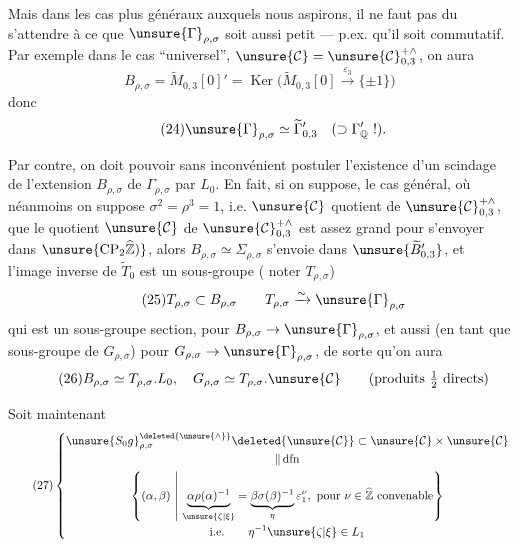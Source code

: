 
Mais dans les cas plus généraux auxquels nous aspirons, il ne faut pas du  s'attendre à ce que $\unsure{\Gamma}_{\rho,\sigma}$ soit aussi petit --- p.ex. qu'il soit commutatif.
Par exemple dans le cas ``universel'', $\unsure{\mathcal{C}}=\unsure{\mathcal{C}}_{0,3}^{+\wedge}$, on aura
\[
\tag{23}
B_{\rho,\sigma}=\widetilde{M}_{0,3}[0]'=
\operatorname{Ker}\bigl(\widetilde{M}_{0,3}[0]\xrightarrow{\varepsilon_3}\{\pm1\}\bigr)
\]
donc
\[
\tag{24}
\unsure{\Gamma}_{\rho,\sigma}\simeq\widetilde{\Gamma}_{0,3}'
\quad(\supset\Gamma_{\mathbb{Q}}'\ !).
\]

Par contre, on doit pouvoir sans inconvénient postuler l'existence d'un scindage  de l'extension $B_{\rho,\sigma}$ de $\Gamma_{\rho,\sigma}$ par $L_0$.
En fait, si on suppose,  
 le cas général, où néanmoins on suppose $\sigma^2=\rho^3=1$, i.e. $\unsure{\mathcal{C}}$ quotient de $\unsure{\mathcal{C}}_{0,3}^{+\wedge}$, que le quotient $\unsure{\mathcal{C}}$ de $\unsure{\mathcal{C}}_{0,3}^{+\wedge}$ est assez grand pour s'envoyer dans $\unsure{\mathrm{CP}_2\widehat{\mathbb{Z}})}$, alors  $B_{\rho,\sigma}\simeq\Sigma_{\rho,\sigma}$ s'envoie dans $\unsure{\widetilde{B}'_{0,3}}$, et l'image inverse de $\widetilde{T}_0$ est un sous-groupe ( noter $T_{\rho,\sigma}$)
\[
\tag{25}
T_{\rho,\sigma}\subset B_{\rho,\sigma}\qquad
T_{\rho,\sigma}\xrightarrow{\sim}\unsure{\Gamma}_{\rho,\sigma}
\]
qui est un sous-groupe section, pour $B_{\rho,\sigma}\to\unsure{\Gamma}_{\rho,\sigma}$, et aussi (en tant que sous-groupe de $G_{\rho,\sigma}$) pour $G_{\rho,\sigma}\to\unsure{\Gamma}_{\rho,\sigma}$, de sorte qu'on aura
\[
\tag{26}
B_{\rho,\sigma}\simeq T_{\rho,\sigma}.L_0,\quad
G_{\rho,\sigma}\simeq T_{\rho,\sigma}.\unsure{\mathcal{C}}
\qquad\text{(produits $\tfrac12$ directs)}
\]


Soit maintenant
\[
\tag{27}
\left\{
\begin{gathered}
\unsure{S_0g}_{\rho,\sigma}^{\deleted{\unsure{\wedge}}}
\deleted{\unsure{\mathcal{C}}}\subset
\unsure{\mathcal{C}}\times\unsure{\mathcal{C}}
\\[-0.3ex]
\Vert\,\mathrm{dfn}
\\
\left\{(\alpha,\beta)\ \middle|\
\underbrace{\alpha\rho(\alpha)^{-1}}_{\unsure{\zeta|\xi}}
=\underbrace{\beta\sigma(\beta)^{-1}}_{\eta}\varepsilon_1^\nu,
\ \text{pour }\nu\in\widehat{\mathbb{Z}}\ \text{convenable}\right\}
\\[-0.3ex]
\text{i.e.}\qquad \eta^{-1}\unsure{\zeta|\xi}\in L_1
\end{gathered}
\right.
\]

